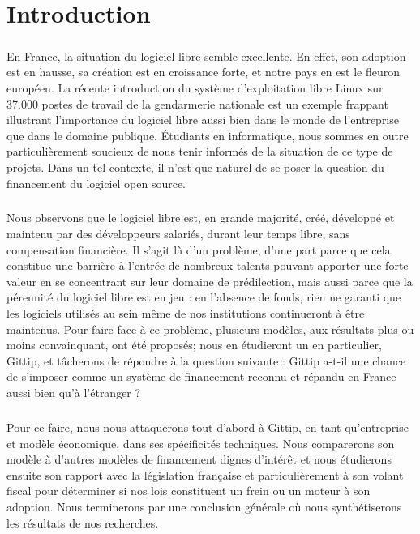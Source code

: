 \chapter*{Introduction}

\paragraph{}
En France, la situation du logiciel libre semble excellente.
En effet, son adoption est en hausse, sa création est en croissance forte,
et notre pays en est le fleuron européen.
La récente introduction du système d'exploitation libre Linux sur 37.000
postes de travail de la gendarmerie nationale est un exemple frappant
illustrant l'importance du logiciel libre aussi bien dans le monde de
l'entreprise que dans le domaine publique.
Étudiants en informatique, nous sommes en outre particulièrement soucieux
de nous tenir informés de la situation de ce type de projets.
Dans un tel contexte, il n'est que naturel de se poser la question du
financement du logiciel open source.

\paragraph{}
Nous observons que le logiciel libre est, en grande majorité, créé,
développé et maintenu par des développeurs salariés, durant leur temps
libre, sans compensation financière. Il s'agit là d'un problème, d'une
part parce que cela constitue une barrière à l'entrée de nombreux talents
pouvant apporter une forte valeur en se concentrant sur leur domaine de
prédilection, mais aussi parce que la pérennité du logiciel libre est en
jeu : en l'absence de fonds, rien ne garanti que les logiciels utilisés
au sein même de nos institutions continueront à être maintenus.
Pour faire face à ce problème, plusieurs modèles, aux résultats plus ou
moins convainquant, ont été proposés; nous en étudieront un en
particulier, Gittip, et tâcherons de répondre à la question suivante :
Gittip a-t-il une chance de s'imposer comme un système de financement
reconnu et répandu en France aussi bien qu'à l'étranger ?

\paragraph{}
Pour ce faire, nous nous attaquerons tout d'abord à Gittip, en tant
qu'entreprise et modèle économique, dans ses spécificités techniques.
Nous comparerons son modèle à d'autres modèles de financement
dignes d'intérêt et nous étudierons ensuite son rapport avec la législation
française et particulièrement à son volant fiscal pour déterminer si nos
lois constituent un frein ou un moteur à son adoption.
Nous terminerons par une conclusion générale où nous synthétiserons
les résultats de nos recherches.
